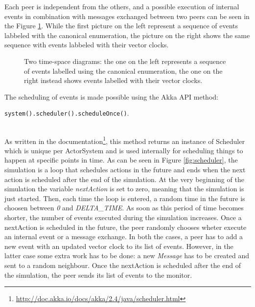 \documentclass[11pt]{article}
\newcommand{\code}[1]{\colorbox{codegray}{\texttt{#1}}}
\begin{document}


\noindent
Each peer is independent from the others, and a possible execution of internal events in combination with messages exchanged between two peers can be seen in the Figure \ref{fig:time_space_diagrams}. While the first picture on the left represent a sequence of events labbeled with the canonical enumeration, the picture on the right shows the same sequence with events labbeled with their vector clocks.

\begin{figure}[ht]
	\centering
	\begin{minipage}{.5\textwidth}
	  \scalebox{.8}{}
	\end{minipage}%
	\begin{minipage}{.5\textwidth}
	  \scalebox{.8}{}
	\end{minipage}
	\caption{Two time-space diagrams: the one on the left represents a sequence of events labelled using the canonical enumeration, the one on the right instead shows events labelled with their vector clocks.}
	\label{fig:time_space_diagrams}
\end{figure}

\noindent
The scheduling of events is made possible using the Akka API method: \\ \vspace{0.2cm}
\centerline{\code{system().scheduler().scheduleOnce()}.}\\
\noindent
As written in the documentation\footnote{\url{http://doc.akka.io/docs/akka/2.4/java/scheduler.html}}, this method returns an instance of Scheduler which is unique per ActorSystem and is used internally for scheduling things to happen at specific points in time. As can be seen in Figure \ref{fig:scheduler}, the simulation is a loop that schedules actions in the future and ends when the next action is scheduled after the end of the simulation. At the very beginning of the simulation the variable \textit{nextAction} is set to zero, meaning that the simulation is just started. Then, each time the loop is entered, a random time in the future is choosen between \textit{0} and \textit{DELTA\_TIME}. As soon as this period of time becomes shorter, the number of events executed during the simulation increases. Once a nextAction is scheduled in the future, the peer randomly chooses wheter execute an internal event or a message exchange. In both the cases, a peer has to add a new event with an updated vector clock to its list of events. However, in the latter case some extra work has to be done: a new \textit{Message} has to be created and sent to a random neighbour. Once the nextAction is scheduled after the end of the simulation, the peer sends its list of events to the monitor.
\end{document}
